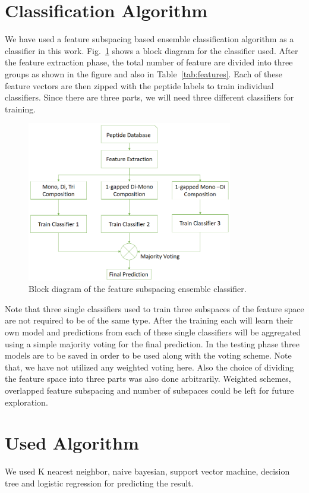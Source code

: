 \section{Classification Algorithm}
We have used a feature subspacing based ensemble classification algorithm as a classifier in this work. Fig.~\ref{fig:en} shows a block diagram for the classifier used. After the feature extraction phase, the total number of feature are divided into three groups as shown in the figure and also in Table~\ref{tab:features}. Each of these feature vectors are then zipped with the peptide labels to train individual classifiers. Since there are three parts, we will need three different classifiers for training.  
\begin{figure}[h]
    \centering
    \includegraphics[width=0.8\textwidth]{ensemble}
    \caption{Block diagram of the feature subspacing ensemble classifier.     \label{fig:en}}
\end{figure}

Note that three single classifiers used to train three subspaces of the feature space are not required to be of the same type. After the training each will learn their own model and predictions from each of these single classifiers will be aggregated using a simple majority voting for the final prediction. In the testing phase three models are to be saved in order to be used along with the voting scheme. Note that, we have not utilized any weighted voting here. Also the choice of dividing the feature space into three parts was also done arbitrarily. Weighted schemes, overlapped feature subspacing and number of subspaces could be left for future exploration. 

\section{Used Algorithm}
We used K nearest neighbor\cite{Anderson07}, naive bayesian\cite{Anderson08}\cite{Anderson09}, support vector machine\cite{Anderson10}, decision tree\cite{safavian1991survey} and logistic regression\cite{hosmer2013applied} for predicting the result.


